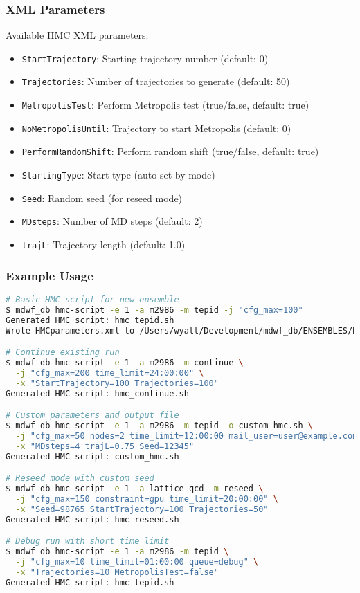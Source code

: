 \documentclass{article}
\begin{document}
\subsubsection{XML Parameters}
Available HMC XML parameters:
\begin{itemize}
\item \texttt{StartTrajectory}: Starting trajectory number (default: 0)
\item \texttt{Trajectories}: Number of trajectories to generate (default: 50)
\item \texttt{MetropolisTest}: Perform Metropolis test (true/false, default: true)
\item \texttt{NoMetropolisUntil}: Trajectory to start Metropolis (default: 0)
\item \texttt{PerformRandomShift}: Perform random shift (true/false, default: true)
\item \texttt{StartingType}: Start type (auto-set by mode)
\item \texttt{Seed}: Random seed (for reseed mode)
\item \texttt{MDsteps}: Number of MD steps (default: 2)
\item \texttt{trajL}: Trajectory length (default: 1.0)
\end{itemize}

\subsubsection{Example Usage}

\begin{lstlisting}[language=bash, caption=HMC Script Examples]
# Basic HMC script for new ensemble
$ mdwf_db hmc-script -e 1 -a m2986 -m tepid -j "cfg_max=100"
Generated HMC script: hmc_tepid.sh
Wrote HMCparameters.xml to /Users/wyatt/Development/mdwf_db/ENSEMBLES/b6.0/b1.8Ls24/mc0.8555/ms0.0725/ml0.02/L32/T64

# Continue existing run
$ mdwf_db hmc-script -e 1 -a m2986 -m continue \
  -j "cfg_max=200 time_limit=24:00:00" \
  -x "StartTrajectory=100 Trajectories=100"
Generated HMC script: hmc_continue.sh

# Custom parameters and output file
$ mdwf_db hmc-script -e 1 -a m2986 -m tepid -o custom_hmc.sh \
  -j "cfg_max=50 nodes=2 time_limit=12:00:00 mail_user=user@example.com" \
  -x "MDsteps=4 trajL=0.75 Seed=12345"
Generated HMC script: custom_hmc.sh

# Reseed mode with custom seed
$ mdwf_db hmc-script -e 1 -a lattice_qcd -m reseed \
  -j "cfg_max=150 constraint=gpu time_limit=20:00:00" \
  -x "Seed=98765 StartTrajectory=100 Trajectories=50"
Generated HMC script: hmc_reseed.sh

# Debug run with short time limit
$ mdwf_db hmc-script -e 1 -a m2986 -m tepid \
  -j "cfg_max=10 time_limit=01:00:00 queue=debug" \
  -x "Trajectories=10 MetropolisTest=false"
Generated HMC script: hmc_tepid.sh
\end{lstlisting}
\end{document}
